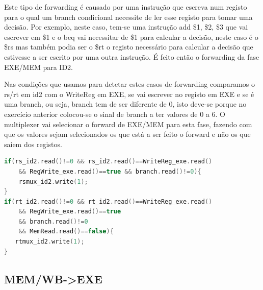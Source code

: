 \documentclass[pdftex,12pt,a4paper]{report}
\begin{document}
Este tipo de forwarding é causado por uma instrução que escreva num registo para o qual um branch condicional necessite de ler esse registo para tomar uma decisão. Por exemplo, neste caso, tem-se uma instrução add \$1, \$2, \$3 que vai escrever em \$1 e o beq vai necessitar de \$1 para calcular a decisão, neste caso é o \$rs mas também podia ser o \$rt o registo necessário para calcular a decisão que estivesse a ser escrito por uma outra instrução. É feito então o forwarding da fase EXE/MEM para ID2.

Nas condições que usamos para detetar estes casos de forwarding comparamos o rs/rt em id2 com o WriteReg em EXE, se vai escrever no registo em EXE e se é uma branch, ou seja, branch tem de ser diferente de 0, isto deve-se porque no exercício anterior colocou-se o sinal de branch a ter valores de 0 a 6. O multiplexer vai selecionar o forward de EXE/MEM para esta fase, fazendo com que os valores sejam selecionados os que está a ser feito o forward e não os que saiem dos registos.

\begin{lstlisting}[language=c]
if(rs_id2.read()!=0 && rs_id2.read()==WriteReg_exe.read() 
	&& RegWrite_exe.read()==true && branch.read()!=0){
    rsmux_id2.write(1);
}
if(rt_id2.read()!=0 && rt_id2.read()==WriteReg_exe.read() 
	&& RegWrite_exe.read()==true 
	&& branch.read()!=0 
	&& MemRead.read()==false){
   rtmux_id2.write(1);
}
\end{lstlisting} 


\subsection{MEM/WB->EXE}

\begin{table}[!htb]
\centering
\label{my-label}
\end{table}
\end{document}
